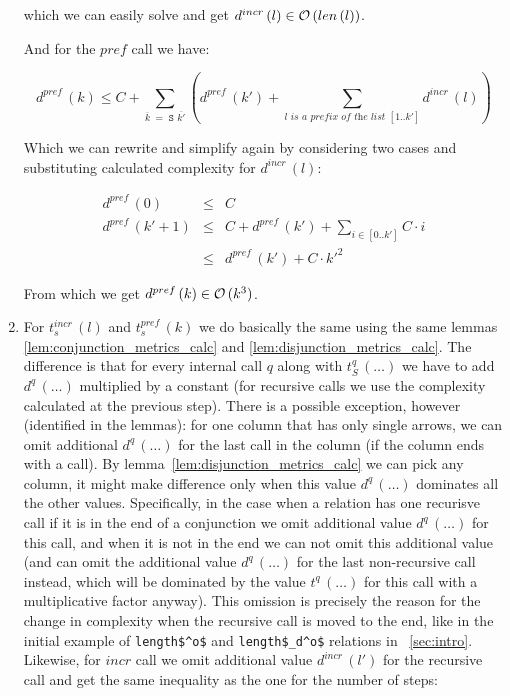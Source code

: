 \begin{enumerate}
which we can easily solve and get $d^{incr}\,(l) \in \mathcal{O}\,(len\,(l))$.

And for the $pref$ call we have:

\[ d^{pref}\,(k) \le C + \sum_{\overline{k} \;=\; \texttt{S $\overline{k'}$}} (d^{pref}\,(k') + \sum_{\textit{$l$ is a prefix of the list $[1..k']$}} d^{incr}\,(l)) \]

Which we can rewrite and simplify again by considering two cases and substituting calculated complexity for $d^{incr}\,(l)$:

\[
\begin{array}{lcl}
d^{pref}\,(0) &\le& C \\
d^{pref}\,(k' + 1) &\le& C + d^{pref}\,(k') + \sum_{i \in [0..k']} C \cdot i \\
            &\le& d^{pref}\,(k') + C \cdot k'^2 
\end{array} \]

From which we get $d^{pref}\,(k) \in \mathcal{O}\,(k^3)$.

\item For $t_s^{incr}\,(l)$ and $t_s^{pref}\,(k)$ we do basically the same using the same lemmas \ref{lem:conjunction_metrics_calc} and \ref{lem:disjunction_metrics_calc}. The difference is that for every internal call $q$ along with $t_S^q\,(\dots)$ we have to add $d^q\,(\dots)$
  multiplied by a constant (for recursive calls we use the complexity calculated at the previous step). There is a possible exception, however (identified in the lemmas): for one column that has only single arrows, we can omit additional $d^q\,(\dots)$ for the last call in the column (if the column ends with a call).
  By lemma~\ref{lem:disjunction_metrics_calc} we can pick any column, it might make difference only when this value $d^q\,(\dots)$ dominates all the other values. Specifically, in the case when a relation has one recurisve call if it is in the end of a conjunction we omit additional value $d^q\,(\dots)$ for this call, and when it is not in the end we can not omit this additional value (and can omit the additional value $d^q\,(\dots)$ for the last non-recursive call instead, which will be dominated by the value $t^q\,(\dots)$ for this call with a multiplicative factor anyway). This omission is precisely the reason for the change in complexity when the recursive call is moved to the end, like in the initial example of \lstinline|length$^o$| and \lstinline|length$_d^o$| relations in \sectionword~\ref{sec:intro}. Likewise, for $incr$ call we omit additional value $d^{incr}\,(l')$ for the recursive call and get the same inequality as the one for the number of steps:


\end{enumerate}
